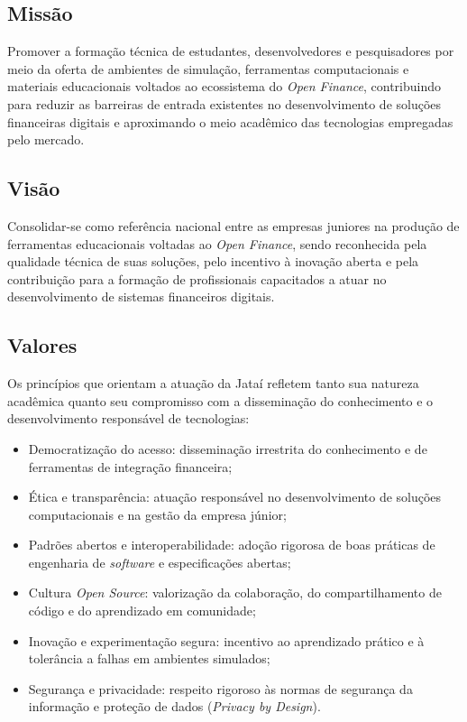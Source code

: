 \documentclass[
  12pt,
  openright,
  oneside,
  a4paper,
  brazilian
]{abntex2}
\newcommand{\openfinance}{\textit{Open Finance}}
\begin{document}
\subsection{Missão}
Promover a formação técnica de estudantes, desenvolvedores e pesquisadores por meio da oferta de ambientes de simulação, ferramentas computacionais e materiais educacionais voltados ao ecossistema do \openfinance{}, contribuindo para reduzir as barreiras de entrada existentes no desenvolvimento de soluções financeiras digitais e aproximando o meio acadêmico das tecnologias empregadas pelo mercado.

\subsection{Visão}
Consolidar-se como referência nacional entre as empresas juniores na produção de ferramentas educacionais voltadas ao \openfinance{}, sendo reconhecida pela qualidade técnica de suas soluções, pelo incentivo à inovação aberta e pela contribuição para a formação de profissionais capacitados a atuar no desenvolvimento de sistemas financeiros digitais.

\subsection{Valores}
Os princípios que orientam a atuação da Jataí refletem tanto sua natureza acadêmica quanto seu compromisso com a disseminação do conhecimento e o desenvolvimento responsável de tecnologias:
\begin{itemize}
    \item{Democratização do acesso:} disseminação irrestrita do conhecimento e de ferramentas de integração financeira;
    \item{Ética e transparência:} atuação responsável no desenvolvimento de soluções computacionais e na gestão da empresa júnior;
    \item{Padrões abertos e interoperabilidade:} adoção rigorosa de boas práticas de engenharia de \textit{software} e especificações abertas;
    \item{Cultura \textit{Open Source}:} valorização da colaboração, do compartilhamento de código e do aprendizado em comunidade;
    \item{Inovação e experimentação segura:} incentivo ao aprendizado prático e à tolerância a falhas em ambientes simulados;
    \item{Segurança e privacidade:} respeito rigoroso às normas de segurança da informação e proteção de dados (\textit{Privacy by Design}).
\end{itemize}
\end{document}
